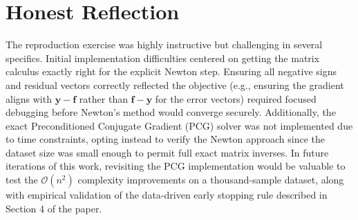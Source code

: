 \documentclass[conference]{IEEEtran}
\begin{document}
\section{Honest Reflection}
The reproduction exercise was highly instructive but challenging in several specifics. Initial implementation difficulties centered on getting the matrix calculus exactly right for the explicit Newton step. Ensuring all negative signs and residual vectors correctly reflected the objective (e.g., ensuring the gradient aligns with $\mathbf{y} - \mathbf{f}$ rather than $\mathbf{f} - \mathbf{y}$ for the error vectors) required focused debugging before Newton's method would converge securely. Additionally, the exact Preconditioned Conjugate Gradient (PCG) solver was not implemented due to time constraints, opting instead to verify the Newton approach since the dataset size was small enough to permit full exact matrix inverses. In future iterations of this work, revisiting the PCG implementation would be valuable to test the $\mathcal{O}(n^2)$ complexity improvements on a thousand-sample dataset, along with empirical validation of the data-driven early stopping rule described in Section 4 of the paper.
\end{document}
